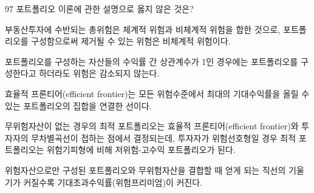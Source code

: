 \begin{question}{97}
포트폴리오 이론에 관한 설명으로 옳지 않은 것은?
\begin{choices}
  \item 부동산투자에 수반되는 총위험은 체계적 위험과 비체계적 위험을 합한 것으로, 포트폴리오를 구성함으로써 제거될 수 있는 위험은 비체계적 위험이다.
  \item 포트폴리오를 구성하는 자산들의 수익률 간 상관계수가 1인 경우에는 포트폴리오를 구성한다고 하더라도 위험은 감소되지 않는다.
  \item 효율적 프론티어(efficient frontier)는 모든 위험수준에서 최대의 기대수익률을 올릴 수 있는 포트폴리오의 집합을 연결한 선이다.
  \item 무위험자산이 없는 경우의 최적 포트폴리오는 효율적 프론티어(efficient frontier)와 투자자의 무차별곡선이 접하는 점에서 결정되는데, 투자자가 위험선호형일 경우 최적 포트폴리오는 위험기피형에 비해 저위험-고수익 포트폴리오가 된다.
  \item 위험자산으로만 구성된 포트폴리오와 무위험자산을 결합할 때 얻게 되는 직선의 기울기가 커질수록 기대초과수익률(위험프리미엄)이 커진다.
\end{choices}
\end{question}
